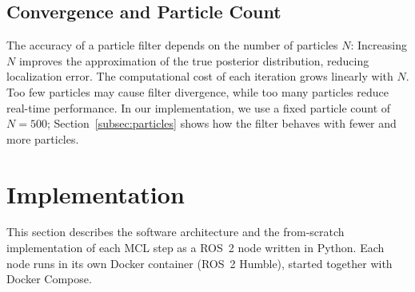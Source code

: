 \documentclass[12pt, a4paper]{article}
\begin{document}
\subsection{Convergence and Particle Count}
\label{subsec:convergence}

The accuracy of a particle filter depends on the number of particles \(N\):
 Increasing \(N\) improves the approximation of the true posterior distribution, reducing localization error.
The computational cost of each iteration grows linearly with \(N\).
  Too few particles may cause filter divergence, while too many particles reduce real-time performance.
In our implementation, we use a fixed particle count of \(N = 500\); Section~\ref{subsec:particles} shows how the filter behaves with fewer and more particles.







\section{Implementation}
\label{sec:implementation}

This section describes the software architecture and the from-scratch implementation of each MCL step as a ROS~2 node written in Python.  Each node runs in its own Docker container (ROS~2 Humble), started together with Docker Compose.

\end{document}
